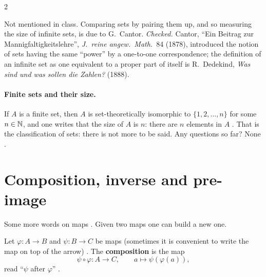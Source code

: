 \begin{paracol}{2}
\begin{history}
Not mentioned in class. Comparing sets by pairing them up, and so measuring the size of infinite sets, is due to G.~Cantor.
\emph{Checked.} Cantor, ``Ein Beitrag zur Mannigfaltigkeitslehre'', \emph{J.\ reine angew.\ Math.}\ 84 (1878),
introduced the notion of sets having the same ``power'' by a one-to-one correspondence; the definition of an infinite
set as one equivalent to a proper part of itself is R.~Dedekind, \emph{Was sind und was sollen die Zahlen?} (1888).
\end{history}

\paragraph{Finite sets and their size.} If $A$ is a finite set, then $A$ is set-theoretically isomorphic to
$\{1,2,\dots,n\}$ for some $n\in\mathbb{N}$, and one writes that the size of $A$ is $n$: there are $n$ elements in $A$
. That is the classification of sets: there is not more to be said. Any questions so far? None
.

\section{Composition, inverse and pre-image}\label{sec:cl-comp}

Some more words on maps . Given two maps one can build a new one.

\begin{definition}\label{def:cl-comp}
Let $\varphi\colon A\to B$ and $\psi\colon B\to C$ be maps (sometimes it is convenient to write the map on top of the
arrow) . The \textbf{composition} is the map
\[
  \psi\circ\varphi\colon A\to C,\qquad a\mapsto\psi(\varphi(a)),
\]
read ``$\psi$ after $\varphi$'' .
\end{definition}


\end{paracol}
